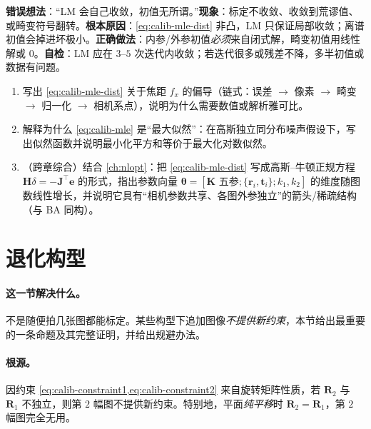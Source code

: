 \begin{pitfall}
\textbf{错误想法}：“LM 会自己收敛，初值无所谓。”\textbf{现象}：标定不收敛、收敛到荒谬值、或畸变符号翻转。\textbf{根本原因}：\cref{eq:calib-mle-dist} 非凸，LM 只保证局部收敛；离谱初值会掉进坏极小。\textbf{正确做法}：内参/外参初值\emph{必须}来自闭式解，畸变初值用线性解或 $0$。\textbf{自检}：LM 应在 $3$--$5$ 次迭代内收敛；若迭代很多或残差不降，多半初值或数据有问题。
\end{pitfall}

\begin{practice}[练习]
\begin{enumerate}
  \item 写出 \cref{eq:calib-mle-dist} 关于焦距 $f_x$ 的偏导（链式：误差 $\to$ 像素 $\to$ 畸变 $\to$ 归一化 $\to$ 相机系点），说明为什么需要数值或解析雅可比。
  \item 解释为什么 \cref{eq:calib-mle} 是“最大似然”：在高斯独立同分布噪声假设下，写出似然函数并说明最小化平方和等价于最大化对数似然。
  \item （跨章综合）结合 \cref{ch:nlopt}：把 \cref{eq:calib-mle-dist} 写成高斯--牛顿正规方程 $\mathbf{H}\delta=-\mathbf{J}^\top\mathbf{e}$ 的形式，指出参数向量 $\boldsymbol{\theta}=[\mathbf{K}\text{ 五参};\{\mathbf{r}_i,\mathbf{t}_i\};k_1,k_2]$ 的维度随图数线性增长，并说明它具有“相机参数共享、各图外参独立”的箭头/稀疏结构（与 BA 同构）。
\end{enumerate}
\end{practice}

\section{退化构型}
\label{sec:calib-degenerate}

\paragraph{这一节解决什么。}
不是随便拍几张图都能标定。某些构型下追加图像\emph{不提供新约束}，本节给出最重要的一条命题及其完整证明，并给出规避办法。

\paragraph{根源。}
因约束 \cref{eq:calib-constraint1,eq:calib-constraint2} 来自旋转矩阵性质，若 $\mathbf{R}_2$ 与 $\mathbf{R}_1$ 不独立，则第 $2$ 幅图不提供新约束\cite{zhang2000calibration}。特别地，平面\emph{纯平移}时 $\mathbf{R}_2=\mathbf{R}_1$，第 $2$ 幅图完全无用。

